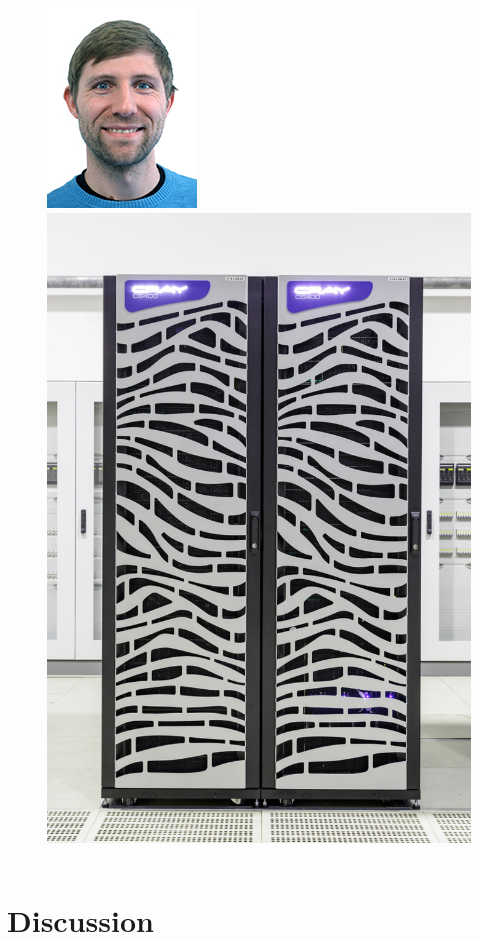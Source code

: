 \documentclass[aspectratio=169]{beamer}
\begin{document}
\begin{frame}
\begin{columns}
\begin{column}{0.48\textwidth}
\begin{figure}
            \includegraphics[width=0.25\linewidth]{andreas.jpg}\quad \includegraphics[width=0.25\linewidth]{juron.jpg} \\
        \end{figure}
    \end{column}
\end{columns}
\end{frame}

\section{Discussion}
\label{sec:discussion}
\end{document}
